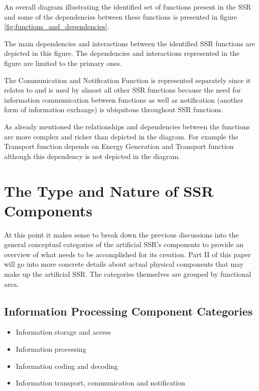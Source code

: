 An overall diagram illustrating
the identified set of functions present in the SSR and some of the
dependencies between these functions is presented in figure \ref{fig:functions_and_dependencies}.

The main dependencies and interactions between the identified SSR
functions are depicted in this figure. The dependencies and interactions
represented in the figure are limited to the primary ones.

The Communication and Notification Function is represented separately
since it relates to and is used by almost all other SSR functions
because the need for information communication between functions as
well as notification (another form of information exchange) is
ubiquitous throughout SSR functions.

As already mentioned the relationships and dependencies between the
functions are more complex and richer than depicted in the diagram. For
example the Transport function depends on Energy Generation and
Transport function although this dependency is not depicted in the
diagram.


\section{The Type and Nature of SSR Components}

At this point it makes sense to break down the previous discussions
into the general conceptual categories of the artificial SSR's components
to provide an overview of what needs to be accomplished for its creation.
Part II of this paper will go into more concrete details about actual
physical components that may make up the artificial SSR.  The categories
themselves are grouped by functional area.

\subsection{Information Processing Component Categories}
\begin{itemize}
\item Information storage and access
\item Information processing
\item Information coding and decoding
\item Information transport, communication and notification
\end{itemize}

